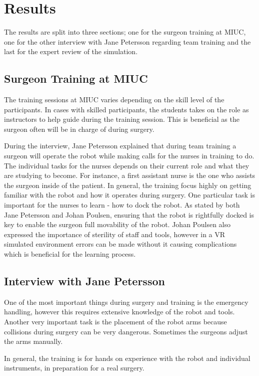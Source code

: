 \section*{Results}
The results are split into three sections; one for the surgeon training at MIUC, one for the other interview with Jane Petersson regarding team training and the last for the expert review of the simulation.

\subsection*{Surgeon Training at MIUC}
The training sessions at MIUC varies depending on the skill level of the participants. In cases with skilled participants, the students takes on the role as instructors to help guide during the training session. This is beneficial as the surgeon often will be in charge of during surgery.

During the interview, Jane Petersson explained that during team training a surgeon will operate the robot while making calls for the nurses in training to do. The individual tasks for the nurses depends on their current role and what they are studying to become. For instance, a first assistant nurse is the one who assists the surgeon inside of the patient. In general, the training focus highly on getting familiar with the robot and how it operates during surgery. One particular task is important for the nurses to learn - how to dock the robot. As stated by both Jane Petersson and Johan Poulsen, ensuring that the robot is rightfully docked is key to enable the surgeon full movability of the robot. Johan Poulsen also expressed the importance of sterility of staff and tools, however in a VR simulated environment errors can be made without it causing complications which is beneficial for the learning process.

\subsection{Interview with Jane Petersson}
One of the most important things during surgery and training is the emergency handling, however this requires extensive knowledge of the robot and tools. Another very important task is the placement of the robot arms because collisions during surgery can be very dangerous. Sometimes the surgeons adjust the arms manually.

In general, the training is for hands on experience with the robot and individual instruments, in preparation for a real surgery.

